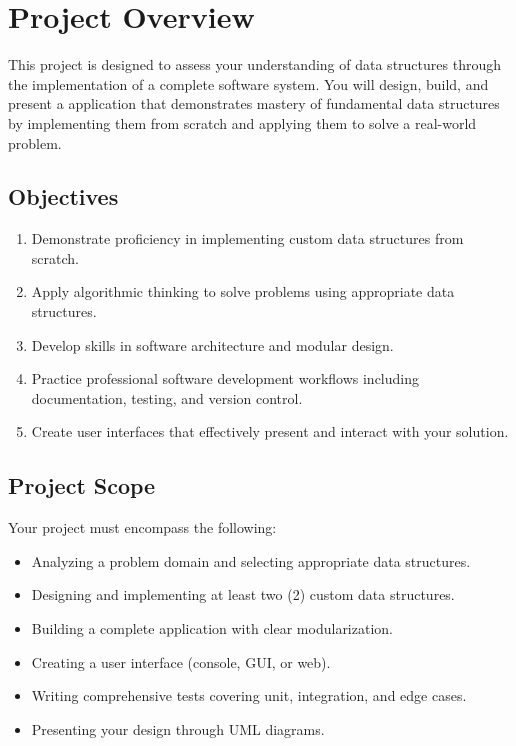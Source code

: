 
\section{Project Overview}

This project is designed to assess your understanding of data structures through the implementation of a complete software system. You will design, build, and present a \cpp{} application that demonstrates mastery of fundamental data structures by implementing them from scratch and applying them to solve a real-world problem.

\subsection{Objectives}

\begin{enumerate}
  \item Demonstrate proficiency in implementing custom data structures from scratch.
  \item Apply algorithmic thinking to solve problems using appropriate data structures.
  \item Develop skills in software architecture and modular design.
  \item Practice professional software development workflows including documentation, testing, and version control.
  \item Create user interfaces that effectively present and interact with your solution.
\end{enumerate}

\subsection{Project Scope}

Your project must encompass the following:

\begin{itemize}
  \item Analyzing a problem domain and selecting appropriate data structures.
  \item Designing and implementing at least two (2) custom data structures.
  \item Building a complete application with clear modularization.
  \item Creating a user interface (console, GUI, or web).
  \item Writing comprehensive tests covering unit, integration, and edge cases.
  \item Presenting your design through UML diagrams.
\end{itemize}

